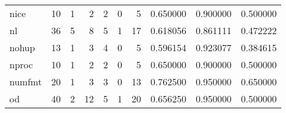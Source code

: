 \begin{longtable}{lrrrrrrrrr}
nice      &                                      10 &                                                  1 &                                                  2 &                                                  2 &                                                  0 &                                                  5 &                                           0.650000 &                               0.900000 &                             0.500000 \\
nl        &                                      36 &                                                  5 &                                                  8 &                                                  5 &                                                  1 &                                                 17 &                                           0.618056 &                               0.861111 &                             0.472222 \\
nohup     &                                      13 &                                                  1 &                                                  3 &                                                  4 &                                                  0 &                                                  5 &                                           0.596154 &                               0.923077 &                             0.384615 \\
nproc     &                                      10 &                                                  1 &                                                  2 &                                                  2 &                                                  0 &                                                  5 &                                           0.650000 &                               0.900000 &                             0.500000 \\
numfmt    &                                      20 &                                                  1 &                                                  3 &                                                  3 &                                                  0 &                                                 13 &                                           0.762500 &                               0.950000 &                             0.650000 \\
od        &                                      40 &                                                  2 &                                                 12 &                                                  5 &                                                  1 &                                                 20 &                                           0.656250 &                               0.950000 &                             0.500000 \\

\end{longtable}

